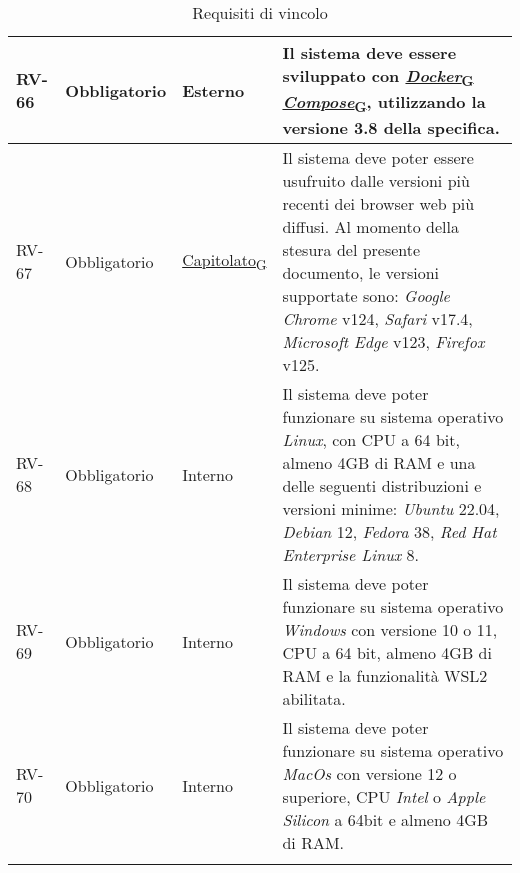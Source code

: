 \begin{longtable}{|>{\centering\arraybackslash}m{}|>{\centering\arraybackslash}m{}|>{\centering\arraybackslash}m{}|>{\centering\arraybackslash}m{}|}
	\\\hline
	RV-66           & Obbligatorio        & Esterno                                                                                                           & Il sistema deve essere sviluppato con \href{https://7last.github.io/docs/pb/documentazione-interna/glossario\#docker-compose}{\href{https://7last.github.io/docs/pb/documentazione-interna/glossario\#docker}{\textit{Docker}\textsubscript{G}}\textit{ Compose}\textsubscript{G}}, utilizzando la versione 3.8 della specifica.
	\\\hline
	RV-67           & Obbligatorio        & \href{https://7last.github.io/docs/pb/documentazione-interna/glossario\#capitolato}{Capitolato\textsubscript{G}} & Il sistema deve poter essere usufruito dalle versioni più recenti dei browser web più diffusi. Al momento della stesura del presente documento, le versioni supportate sono: \textit{Google Chrome} v124, \textit{Safari} v17.4, \textit{Microsoft Edge} v123, \textit{Firefox} v125.
	\\\hline
	RV-68           & Obbligatorio        & Interno                                                                                                           & Il sistema deve poter funzionare su sistema operativo \textit{Linux}, con CPU a 64 bit, almeno 4GB di RAM e una delle seguenti distribuzioni e versioni minime: \textit{Ubuntu} 22.04, \textit{Debian} 12, \textit{Fedora} 38, \textit{Red Hat Enterprise Linux} 8.
	\\\hline
	RV-69           & Obbligatorio        & Interno                                                                                                           & Il sistema deve poter funzionare su sistema operativo \textit{Windows} con versione 10 o 11, CPU a 64 bit, almeno 4GB di RAM e la funzionalità WSL2 abilitata.
	\\\hline
	RV-70           & Obbligatorio        & Interno                                                                                                           & Il sistema deve poter funzionare su sistema operativo \textit{MacOs} con versione 12 o superiore, CPU \textit{Intel} o \textit{Apple Silicon} a 64bit e almeno 4GB di RAM.
	\\\hline
	\caption{Requisiti di vincolo}
\end{longtable}

